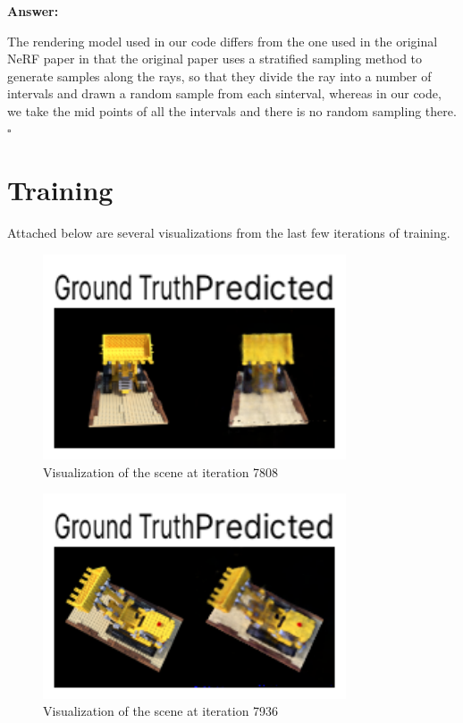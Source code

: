 \documentclass[12pt]{article}
\newenvironment{answer}{%
  \par\noindent\textbf{Answer:}\quad
}{%
  \hfill$\square$\par
}
\begin{document}
\begin{answer}
    The rendering model used in our code differs from the one used in the original NeRF paper in that the original paper uses a stratified sampling method to generate samples along the rays, so that they divide the ray into a number of intervals and drawn a random sample from each sinterval, whereas in our code, we take the mid points of all the intervals and there is no random sampling there. 
\end{answer}

\section{Training}
Attached below are several visualizations from the last few iterations of training.
\begin{figure}[H]
    \centering
    \includegraphics[width=0.8\textwidth]{outputs/progress/007808.png}
    \caption{Visualization of the scene at iteration 7808}
\end{figure}

\begin{figure}[H]
    \centering 
    \includegraphics[width=0.8\textwidth]{outputs/progress/007936.png}
    \caption{Visualization of the scene at iteration 7936}
\end{figure}
\end{document}
